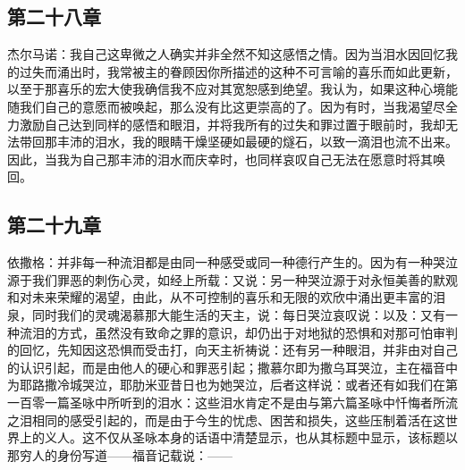 
\subsection{第二十八章}

\par

杰尔马诺：我自己这卑微之人确实并非全然不知这感悟之情。因为当泪水因回忆我的过失而涌出时，我常被主的眷顾因你所描述的这种不可言喻的喜乐而如此更新，以至于那喜乐的宏大使我确信我不应对其宽恕感到绝望。我认为，如果这种心境能随我们自己的意愿而被唤起，那么没有比这更崇高的了。因为有时，当我渴望尽全力激励自己达到同样的感悟和眼泪，并将我所有的过失和罪过置于眼前时，我却无法带回那丰沛的泪水，我的眼睛干燥坚硬如最硬的燧石，以致一滴泪也流不出来。因此，当我为自己那丰沛的泪水而庆幸时，也同样哀叹自己无法在愿意时将其唤回。\par


\subsection{第二十九章}

\par

依撒格：并非每一种流泪都是由同一种感受或同一种德行产生的。因为有一种哭泣源于我们罪恶的刺伤心灵，如经上所载：又说：另一种哭泣源于对永恒美善的默观和对未来荣耀的渴望，由此，从不可控制的喜乐和无限的欢欣中涌出更丰富的泪泉，同时我们的灵魂渴慕那大能生活的天主，说：每日哭泣哀叹说：以及：又有一种流泪的方式，虽然没有致命之罪的意识，却仍出于对地狱的恐惧和对那可怕审判的回忆，先知因这恐惧而受击打，向天主祈祷说：还有另一种眼泪，并非由对自己的认识引起，而是由他人的硬心和罪恶引起；撒慕尔即为撒乌耳哭泣，主在福音中为耶路撒冷城哭泣，耶肋米亚昔日也为她哭泣，后者这样说：或者还有如我们在第一百零一篇圣咏中所听到的泪水：这些泪水肯定不是由与第六篇圣咏中忏悔者所流之泪相同的感受引起的，而是由于今生的忧虑、困苦和损失，这些压制着活在这世界上的义人。这不仅从圣咏本身的话语中清楚显示，也从其标题中显示，该标题以那穷人的身份写道——福音记载说：——\par

